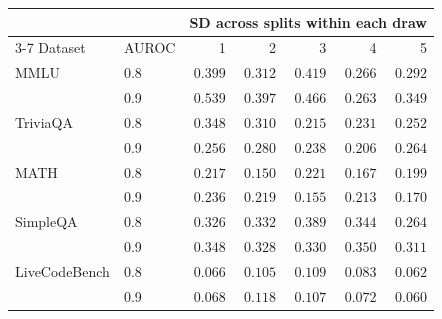 \begin{tabular}{llrrrrr}
\toprule
& & \multicolumn{5}{c}{SD across splits within each draw} \\
\cmidrule(lr){3-7}
Dataset & AUROC & 1 & 2 & 3 & 4 & 5 \\
\midrule
MMLU & 0.8 & $0.399$ & $0.312$ & $0.419$ & $0.266$ & $0.292$ \\
 & 0.9 & $0.539$ & $0.397$ & $0.466$ & $0.263$ & $0.349$ \\
\addlinespace[2pt]
TriviaQA & 0.8 & $0.348$ & $0.310$ & $0.215$ & $0.231$ & $0.252$ \\
 & 0.9 & $0.256$ & $0.280$ & $0.238$ & $0.206$ & $0.264$ \\
\addlinespace[2pt]
MATH & 0.8 & $0.217$ & $0.150$ & $0.221$ & $0.167$ & $0.199$ \\
 & 0.9 & $0.236$ & $0.219$ & $0.155$ & $0.213$ & $0.170$ \\
\addlinespace[2pt]
SimpleQA & 0.8 & $0.326$ & $0.332$ & $0.389$ & $0.344$ & $0.264$ \\
 & 0.9 & $0.348$ & $0.328$ & $0.330$ & $0.350$ & $0.311$ \\
\addlinespace[2pt]
LiveCodeBench & 0.8 & $0.066$ & $0.105$ & $0.109$ & $0.083$ & $0.062$ \\
 & 0.9 & $0.068$ & $0.118$ & $0.107$ & $0.072$ & $0.060$ \\
\bottomrule
\end{tabular}
